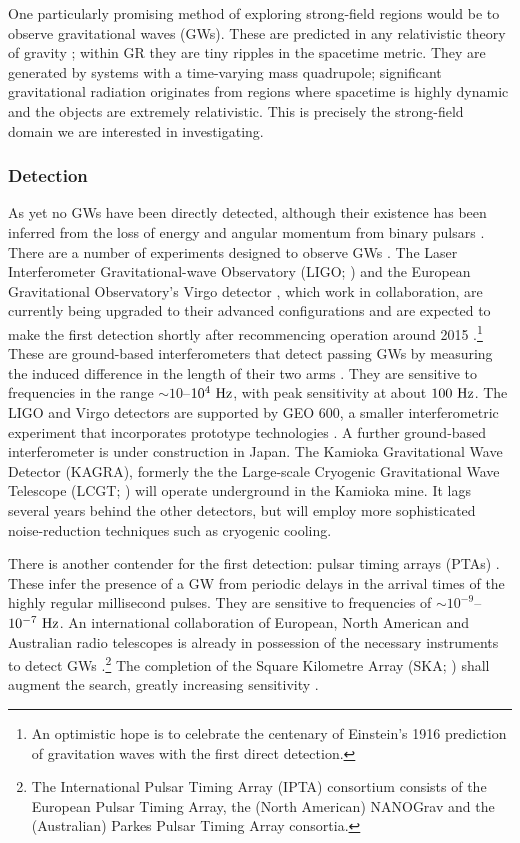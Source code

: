 {One particularly promising method of exploring strong-field regions would be to observe gravitational waves (GWs). These are predicted in any relativistic theory of gravity \citep{Schutz1984}; within GR they are tiny ripples in the spacetime metric. They are generated by systems with a time-varying mass quadrupole; significant gravitational radiation originates from regions where spacetime is highly dynamic and the objects are extremely relativistic. This is precisely the strong-field domain we are interested in investigating.

\subsubsection{Detection}

As yet no GWs have been directly detected, although their existence has been inferred from the loss of energy and angular momentum from binary pulsars \citep{Stairs2003}. There are a number of experiments designed to observe GWs \citep{Riles2012}. The Laser Interferometer Gravitational-wave Observatory (LIGO; \citealt{Abramovici1992}) and the European Gravitational Observatory's Virgo detector \citep{Acernese2008a}, which work in collaboration, are currently being upgraded to their advanced configurations and are expected to make the first detection shortly after recommencing operation around 2015 \citep{Harry2010,Accadia2011}.\footnote{An optimistic hope is to celebrate the centenary of Einstein's 1916 prediction of gravitation waves \citep[document 32]{Einstein1997} with the first direct detection.} These are ground-based interferometers that detect passing GWs by measuring the induced difference in the length of their two arms \citep{Pitkin2011}. They are sensitive to frequencies in the range $\sim10$--$10^4~\mathrm{Hz}$, with peak sensitivity at about $100~\mathrm{Hz}$. The LIGO and Virgo detectors are supported by GEO 600, a smaller interferometric experiment that incorporates prototype technologies \citep{Willke2002,Willke2006}. A further ground-based interferometer is under construction in Japan. The Kamioka Gravitational Wave Detector (KAGRA), formerly the the Large-scale Cryogenic Gravitational Wave Telescope (LCGT; \citealt{Kuroda1999,Kuroda2010}) will operate underground in the Kamioka mine. It lags several years behind the other detectors, but will employ more sophisticated noise-reduction techniques such as cryogenic cooling.

There is another contender for the first detection: pulsar timing arrays (PTAs) \citep{McWilliams2012,Sesana2012a}. These infer the presence of a GW from periodic delays in the arrival times of the highly regular millisecond pulses. They are sensitive to frequencies of $\sim10^{-9}$--$10^{-7}~\mathrm{Hz}$. An international collaboration of European, North American and Australian radio telescopes is already in possession of the necessary instruments to detect GWs \citep{Hobbs2010}.\footnote{The International Pulsar Timing Array (IPTA) consortium consists of the European Pulsar Timing Array, the (North American) NANOGrav and the (Australian) Parkes Pulsar Timing Array consortia.} The completion of the Square Kilometre Array (SKA; \citealt{Dewdney2009}) shall augment the search, greatly increasing sensitivity \citep{Kramer2004}.

}
